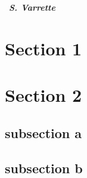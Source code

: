 \documentclass{article}
\begin{document}

\begin{welcome}
  \lipsum[1]
  
  ~\hfill\emph{\textbf{S. Varrette}}
\end{welcome}



\section{Section 1}
\lipsum[2]

\section{Section 2}
\subsection{subsection a}
\lipsum[3]
\subsection{subsection b}
\lipsum[4]

\end{document}
